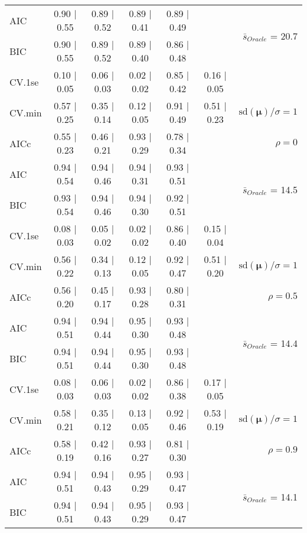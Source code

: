 \begin{table}
\begin{center}
\begin{tabular}{l*{5}{c}|r}
AIC & 0.90 $\mid$ 0.55 & 0.89 $\mid$ 0.52 & 0.89 $\mid$ 0.41 & 0.89 $\mid$ 0.49 & &  \multirow{2}{*}{$\bar{s}_{Oracle}$ = 20.7} \\
BIC & 0.90 $\mid$ 0.55 & 0.89 $\mid$ 0.52 & 0.89 $\mid$ 0.40 & 0.86 $\mid$ 0.48 & &  \\
 \hline 
CV.1se & 0.10 $\mid$ 0.05 & 0.06 $\mid$ 0.03 & 0.02 $\mid$ 0.02 & 0.85 $\mid$ 0.42 & 0.16 $\mid$ 0.05 & \\
CV.min & 0.57 $\mid$ 0.25 & 0.35 $\mid$ 0.14 & 0.12 $\mid$ 0.05 & 0.91 $\mid$ 0.49 & 0.51 $\mid$ 0.23 &  $\mathrm{sd}(\mathbf{\mu})/\sigma=1$ \\
AICc & 0.55 $\mid$ 0.23 & 0.46 $\mid$ 0.21 & 0.93 $\mid$ 0.29 & 0.78 $\mid$ 0.34 & & $\rho=0$ \\
AIC & 0.94 $\mid$ 0.54 & 0.94 $\mid$ 0.46 & 0.94 $\mid$ 0.31 & 0.93 $\mid$ 0.51 & &  \multirow{2}{*}{$\bar{s}_{Oracle}$ = 14.5} \\
BIC & 0.93 $\mid$ 0.54 & 0.94 $\mid$ 0.46 & 0.94 $\mid$ 0.30 & 0.92 $\mid$ 0.51 & &  \\
 \hline 
CV.1se & 0.08 $\mid$ 0.03 & 0.05 $\mid$ 0.02 & 0.02 $\mid$ 0.02 & 0.86 $\mid$ 0.40 & 0.15 $\mid$ 0.04 & \\
CV.min & 0.56 $\mid$ 0.22 & 0.34 $\mid$ 0.13 & 0.12 $\mid$ 0.05 & 0.92 $\mid$ 0.47 & 0.51 $\mid$ 0.20 &  $\mathrm{sd}(\mathbf{\mu})/\sigma=1$ \\
AICc & 0.56 $\mid$ 0.20 & 0.45 $\mid$ 0.17 & 0.93 $\mid$ 0.28 & 0.80 $\mid$ 0.31 & & $\rho=0.5$ \\
AIC & 0.94 $\mid$ 0.51 & 0.94 $\mid$ 0.44 & 0.95 $\mid$ 0.30 & 0.93 $\mid$ 0.48 & &  \multirow{2}{*}{$\bar{s}_{Oracle}$ = 14.4} \\
BIC & 0.94 $\mid$ 0.51 & 0.94 $\mid$ 0.44 & 0.95 $\mid$ 0.30 & 0.93 $\mid$ 0.48 & &  \\
 \hline 
CV.1se & 0.08 $\mid$ 0.03 & 0.06 $\mid$ 0.03 & 0.02 $\mid$ 0.02 & 0.86 $\mid$ 0.38 & 0.17 $\mid$ 0.05 & \\
CV.min & 0.58 $\mid$ 0.21 & 0.35 $\mid$ 0.12 & 0.13 $\mid$ 0.05 & 0.92 $\mid$ 0.46 & 0.53 $\mid$ 0.19 &  $\mathrm{sd}(\mathbf{\mu})/\sigma=1$ \\
AICc & 0.58 $\mid$ 0.19 & 0.42 $\mid$ 0.16 & 0.93 $\mid$ 0.27 & 0.81 $\mid$ 0.30 & & $\rho=0.9$ \\
AIC & 0.94 $\mid$ 0.51 & 0.94 $\mid$ 0.43 & 0.95 $\mid$ 0.29 & 0.93 $\mid$ 0.47 & &  \multirow{2}{*}{$\bar{s}_{Oracle}$ = 14.1} \\
BIC & 0.94 $\mid$ 0.51 & 0.94 $\mid$ 0.43 & 0.95 $\mid$ 0.29 & 0.93 $\mid$ 0.47 & &  \\

\end{tabular}
\end{center}
\end{table}
